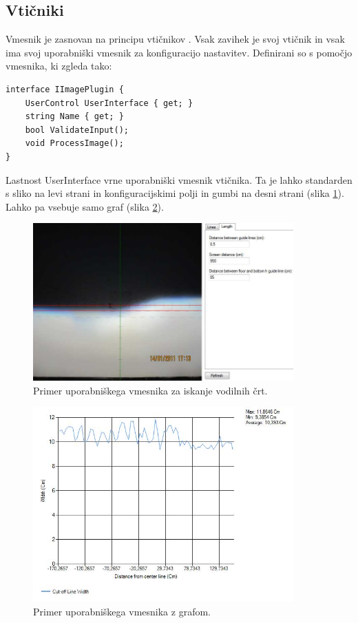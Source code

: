 \documentclass[oneside, a4paper, 12pt]{book}
\begin{document}
\subsection{Vtičniki}

Vmesnik je zasnovan na principu vtičnikov \cite{oreilly-cs, oreilly-dp}. Vsak zavihek je svoj vtičnik in vsak ima svoj uporabniški vmesnik za konfiguracijo nastavitev. Definirani so s pomočjo vmesnika, ki zgleda tako:

\begin{verbatim}
interface IImagePlugin {
    UserControl UserInterface { get; }
    string Name { get; }
    bool ValidateInput();
    void ProcessImage();
}
\end{verbatim}
Lastnost UserInterface vrne uporabniški vmesnik vtičnika. Ta je lahko standarden s sliko na levi strani in konfiguracijskimi polji in gumbi na desni strani (slika \ref{pic:vmesnik2}). Lahko pa vsebuje samo graf (slika \ref{pic:vmesnik3}).


\begin{figure}
\begin{center}
\includegraphics[width=10cm]{slike/vmesnik-slika-konfiguracija.jpg}
\end{center}
\caption{Primer uporabniškega vmesnika za iskanje vodilnih črt.}
\label{pic:vmesnik2}
\end{figure}

\begin{figure}
\begin{center}
\includegraphics[width=10cm]{slike/vmesnik-samo-graf.jpg}
\end{center}
\caption{Primer uporabniškega vmesnika z grafom.}
\label{pic:vmesnik3}
\end{figure}
\end{document}
